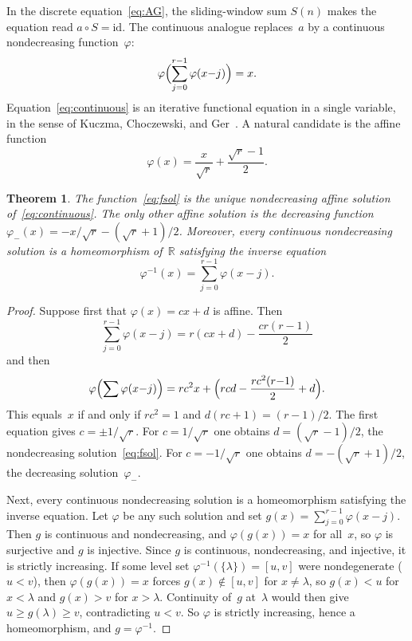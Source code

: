 \documentclass{birkjour}
\newtheorem{theorem}{Theorem}
\theoremstyle{definition}
\theoremstyle{remark}
\begin{document}
In the discrete equation~\eqref{eq:AG}, the
sliding-window sum $S(n)$ makes the equation read
$a\circ S=\mathrm{id}$.
The continuous analogue replaces~$a$ by a continuous
nondecreasing function~$\varphi$:
\begin{equation}\label{eq:continuous}
  \varphi\Bigl(\sum_{j=0}^{r-1}\varphi(x{-}j)\Bigr)=x.
\end{equation}
Equation~\eqref{eq:continuous} is an iterative functional
equation in a single variable, in the sense of Kuczma,
Choczewski, and Ger~\cite{KCG}.
A natural candidate is the affine function
\begin{equation}\label{eq:fsol}
  \varphi(x)=\frac{x}{\sqrt{r}}+\frac{\sqrt{r}-1}{2}.
\end{equation}

\begin{theorem}\label{thm:continuous}
The function~\eqref{eq:fsol} is the unique nondecreasing
affine solution of~\eqref{eq:continuous}. The only other
affine solution is the decreasing function
$\varphi_{-}(x)=-x/\!\sqrt{r}-(\sqrt{r}+1)/2$.
Moreover, every continuous nondecreasing solution
is a homeomorphism of~$\mathbb{R}$ satisfying
the inverse equation
\begin{equation}\label{eq:inverse}
  \varphi^{-1}(x)=\sum_{j=0}^{r-1}\varphi(x{-}j).
\end{equation}
\end{theorem}

\begin{proof}
Suppose first that $\varphi(x)=cx+d$ is affine. Then
\[
  \sum_{j=0}^{r-1}\varphi(x{-}j)
  =r(cx+d)-\frac{cr(r{-}1)}{2}
\]
and then
\[
  \varphi\Bigl(\sum\varphi(x{-}j)\Bigr)
  =rc^{2}x+\Bigl(rcd-\frac{rc^{2}(r{-}1)}{2}+d\Bigr).
\]
This equals~$x$ if and only if $rc^{2}=1$
and $d(rc+1)=(r{-}1)/2$. The first equation gives
$c=\pm 1/\!\sqrt{r}$. For $c=1/\!\sqrt{r}$ one obtains
$d=(\sqrt{r}-1)/2$, the nondecreasing
solution~\eqref{eq:fsol}. For $c=-1/\!\sqrt{r}$ one obtains
$d=-(\sqrt{r}+1)/2$, the decreasing solution~$\varphi_{-}$.

Next, every continuous nondecreasing solution is a
homeomorphism satisfying the inverse equation.
Let $\varphi$ be any such solution and set
$g(x)=\sum_{j=0}^{r-1}\varphi(x{-}j)$.
Then $g$ is continuous and nondecreasing, and
$\varphi(g(x))=x$ for all~$x$,
so $\varphi$ is surjective and $g$ is injective.
Since $g$ is continuous, nondecreasing, and injective,
it is strictly increasing.
If some level set $\varphi^{-1}(\{\lambda\})=[u,v]$ were
nondegenerate ($u<v$), then $\varphi(g(x))=x$ forces
$g(x)\notin[u,v]$ for $x\ne\lambda$, so $g(x)<u$ for $x<\lambda$
and $g(x)>v$ for $x>\lambda$. Continuity of~$g$ at~$\lambda$
would then give $u\ge g(\lambda)\ge v$, contradicting $u<v$.
So $\varphi$ is strictly increasing, hence a
homeomorphism, and $g=\varphi^{-1}$.
\end{proof}
\end{document}

